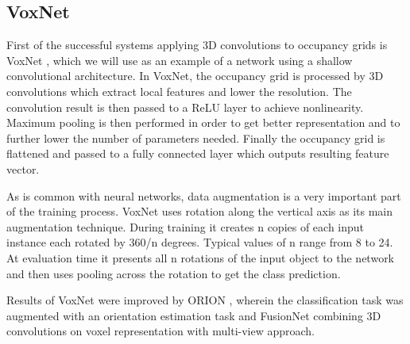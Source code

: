 \subsection{VoxNet}
First of the successful systems applying 3D convolutions to occupancy grids is VoxNet \cite{maturana_voxnet:_2015}, which we will use as an example of a network using a shallow convolutional architecture. 
In VoxNet, the occupancy grid is processed by 3D convolutions which extract local features and lower the resolution. The convolution result is then passed to a ReLU layer to achieve nonlinearity. Maximum pooling is then performed in order to get better representation and to further lower the number of parameters needed. Finally the occupancy grid is flattened and passed to a fully connected layer which outputs resulting feature vector. \par  
As is common with neural networks, data augmentation is a very important part of the training process. VoxNet uses rotation along the vertical axis as its main augmentation technique. During training it creates n copies of each input instance each rotated by 360/n degrees. Typical values of n range from 8 to 24. At evaluation time it presents all n rotations of the input object to the network and then uses pooling across the rotation to get the class prediction. \par
Results of VoxNet were improved by ORION \cite{sedaghat_orientation-boosted_2016}, wherein the classification task was augmented
with an orientation estimation task and FusionNet \cite{hegde_fusionnet:_2016} combining 3D convolutions on voxel representation with multi-view approach.



